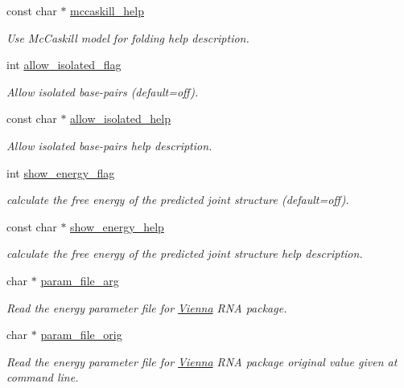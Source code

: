 \begin{DoxyCompactItemize}
const char $\ast$ \hyperlink{structgengetopt__args__info_a153efa81aed0fc8be8e0e793cb62ffd7}{mccaskill\+\_\+help}
\begin{DoxyCompactList}\small\item\em Use Mc\+Caskill model for folding help description. \end{DoxyCompactList}\item 
int \hyperlink{structgengetopt__args__info_a7253dcfc654558789f9bdd5b6e29a3bb}{allow\+\_\+isolated\+\_\+flag}
\begin{DoxyCompactList}\small\item\em Allow isolated base-\/pairs (default=off). \end{DoxyCompactList}\item 
const char $\ast$ \hyperlink{structgengetopt__args__info_accb0df971eca4af7ced072388135ed2b}{allow\+\_\+isolated\+\_\+help}
\begin{DoxyCompactList}\small\item\em Allow isolated base-\/pairs help description. \end{DoxyCompactList}\item 
int \hyperlink{structgengetopt__args__info_a53618c4b58a0f0c1ebc48f773878ae03}{show\+\_\+energy\+\_\+flag}
\begin{DoxyCompactList}\small\item\em calculate the free energy of the predicted joint structure (default=off). \end{DoxyCompactList}\item 
const char $\ast$ \hyperlink{structgengetopt__args__info_a2deb60524353a2560c25fd0883cd225f}{show\+\_\+energy\+\_\+help}
\begin{DoxyCompactList}\small\item\em calculate the free energy of the predicted joint structure help description. \end{DoxyCompactList}\item 
char $\ast$ \hyperlink{structgengetopt__args__info_aa68408ac76065d32115a6517d1dc084f}{param\+\_\+file\+\_\+arg}
\begin{DoxyCompactList}\small\item\em Read the energy parameter file for \hyperlink{namespace_vienna}{Vienna} R\+N\+A package. \end{DoxyCompactList}\item 
char $\ast$ \hyperlink{structgengetopt__args__info_af063ce92f6e760b3edfd61e488221afb}{param\+\_\+file\+\_\+orig}
\begin{DoxyCompactList}\small\item\em Read the energy parameter file for \hyperlink{namespace_vienna}{Vienna} R\+N\+A package original value given at command line. \end{DoxyCompactList}\item 

\end{DoxyCompactItemize}
